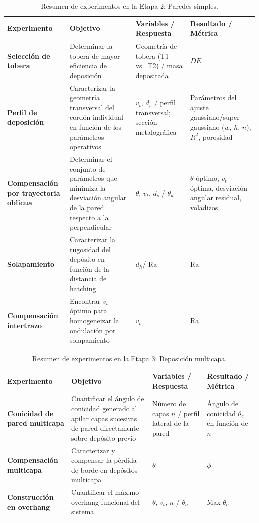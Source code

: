 \begin{table}[htbp]
	\centering
	\caption[Resumen de experimentos en la Etapa 2: Paredes simples]{Resumen de experimentos en la Etapa 2: Paredes simples.}
	\label{tab:resumen_etapa2}
	\footnotesize
	\renewcommand{\arraystretch}{1.5}
	\begin{tabular}{>{\bfseries}p{} p{} p{} p{}}
		\toprule
		Experimento & Objetivo & Variables / Respuesta & Resultado / Métrica \\
		\midrule
		Selección de tobera &
		Determinar la tobera de mayor eficiencia de deposición &
		Geometría de tobera (T1 vs.\ T2) / masa depositada &
		$DE$ \\
		\midrule
		Perfil de deposición &
		Caracterizar la geometría transversal del cordón individual en función de los parámetros operativos &
	    $v_t$, $d_{s}$ / perfil transversal; sección metalográfica &
		Parámetros del ajuste gaussiano/super-gaussiano ($w$, $h$, $n$), $R^2$, porosidad \\
		\midrule
		Compensación por trayectoria oblicua &
		Determinar el conjunto de parámetros que minimiza la desviación angular de la pared respecto a la perpendicular &
 	    $\theta$, $v_t$, $d_{s}$  / $\theta_{w}$ &
		$\theta$ óptimo, $v_t$ óptima, desviación angular residual, voladizos \\
		\midrule
		Solapamiento & Caracterizar la rugosidad del depósito en función de la distancia de hatching & $d_{h}$/ Ra & Ra\\
		\midrule 
		Compensación intertrazo & Encontrar $v_{t}$ óptimo para homogeneizar la ondulación por solapamiento & $v_{t}$ & Ra\\
		\bottomrule
	\end{tabular}
\end{table}

\begin{table}[htbp]
	\centering

	\caption[Resumen de experimentos en la Etapa 3: Deposición multicapa]{Resumen de experimentos en la Etapa 3: Deposición multicapa.}
	\label{tab:resumen_etapa3}
		\footnotesize
	\renewcommand{\arraystretch}{1.5}
	\begin{tabular}{>{\bfseries}p{} p{} p{} p{}}
		\toprule
		Experimento & Objetivo & Variables / Respuesta & Resultado / Métrica \\
		\midrule
		Conicidad de pared multicapa &
		Cuantificar el ángulo de conicidad generado al apilar capas sucesivas de pared directamente sobre depósito previo &
		Número de capas $n$  / perfil lateral de la pared &
		Ángulo de conicidad $\theta_c$ en función de $n$ \\ 		\midrule
		Compensación multicapa & Caracterizar y compensar la pérdida de borde en depósitos multicapa & $\theta$ & $\phi$ \\
				\midrule
				Construcción en overhang & Cuantificar el máximo overhang funcional del sistema  & $\theta$, $v_{t}$, $n$ / $\theta_{o}$ & Max $\theta_{o}$ \\
		\bottomrule
	\end{tabular}
\end{table}


